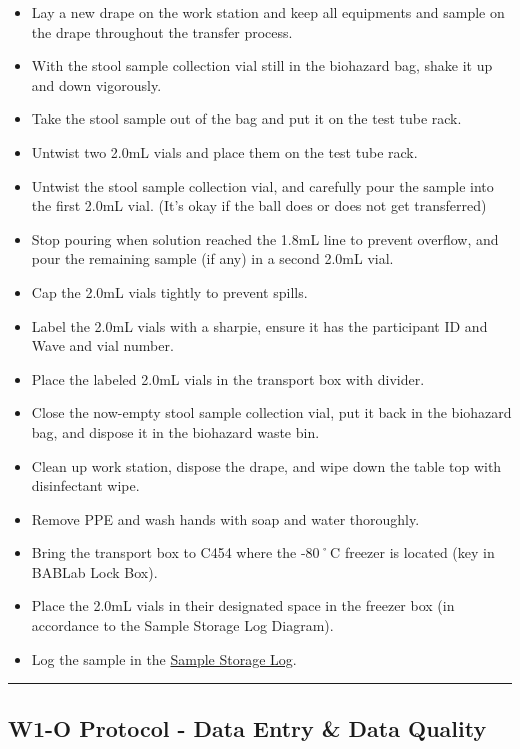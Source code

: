 \documentclass[]{book}
\providecommand{\tightlist}{%
  \setlength{\itemsep}{0pt}\setlength{\parskip}{0pt}}
\begin{document}
\begin{itemize}
\tightlist
\item
  Lay a new drape on the work station and keep all equipments and sample on the drape throughout the transfer process.
\item
  With the stool sample collection vial still in the biohazard bag, shake it up and down vigorously.
\item
  Take the stool sample out of the bag and put it on the test tube rack.
\item
  Untwist two 2.0mL vials and place them on the test tube rack.
\item
  Untwist the stool sample collection vial, and carefully pour the sample into the first 2.0mL vial. (It's okay if the ball does or does not get transferred)
\item
  Stop pouring when solution reached the 1.8mL line to prevent overflow, and pour the remaining sample (if any) in a second 2.0mL vial.
\item
  Cap the 2.0mL vials tightly to prevent spills.
\item
  Label the 2.0mL vials with a sharpie, ensure it has the participant ID and Wave and vial number.
\item
  Place the labeled 2.0mL vials in the transport box with divider.
\item
  Close the now-empty stool sample collection vial, put it back in the biohazard bag, and dispose it in the biohazard waste bin.
\item
  Clean up work station, dispose the drape, and wipe down the table top with disinfectant wipe.
\item
  Remove PPE and wash hands with soap and water thoroughly.
\item
  Bring the transport box to C454 where the -80˚C freezer is located (key in BABLab Lock Box).
\item
  Place the 2.0mL vials in their designated space in the freezer box (in accordance to the Sample Storage Log Diagram).
\item
  Log the sample in the \href{https://app.box.com/file/630322897864}{Sample Storage Log}.
\end{itemize}

\begin{center}\rule{0.5\linewidth}{0.5pt}\end{center}

\hypertarget{w1-o-protocol---data-entry-data-quality}{%
\subsection{W1-O Protocol - Data Entry \& Data Quality}\label{w1-o-protocol---data-entry-data-quality}}
\end{document}
